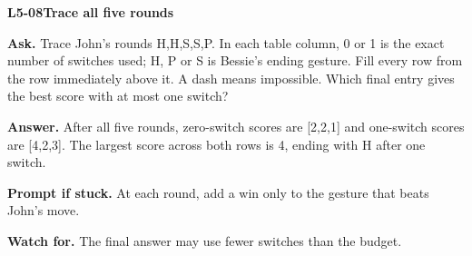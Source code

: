 \documentclass[11pt,a4paper]{article}
\begin{document}
\noindent\begin{minipage}{\textwidth}
{\color{teal}\textbf{L5-08}}\quad \textbf{Trace all five rounds}\par\smallskip
\textbf{Ask.} Trace John's rounds H,H,S,S,P. In each table column, 0 or 1 is the exact number of switches used; H, P or S is Bessie's ending gesture. Fill every row from the row immediately above it. A dash means impossible. Which final entry gives the best score with at most one switch?\par\smallskip
\textbf{Answer.} After all five rounds, zero-switch scores are [2,2,1] and one-switch scores are [4,2,3]. The largest score across both rows is 4, ending with H after one switch.\par\smallskip
\textbf{Prompt if stuck.} At each round, add a win only to the gesture that beats John's move.\par\smallskip
\textbf{Watch for.} The final answer may use fewer switches than the budget.
\end{minipage}\par{}\medskip
\end{document}

